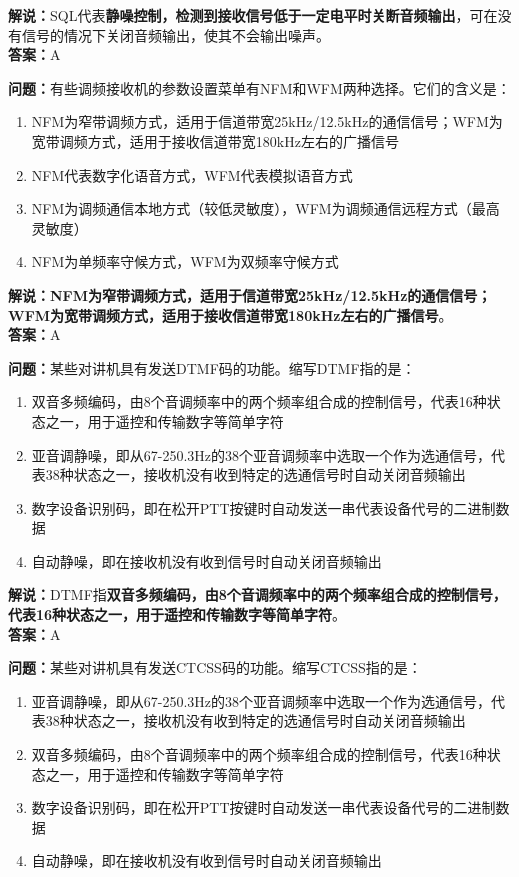 \textbf{解说：}SQL代表\textbf{静噪控制，检测到接收信号低于一定电平时关断音频输出}，可在没有信号的情况下关闭音频输出，使其不会输出噪声。\\\textbf{答案：}A%



\textbf{问题：}有些调频接收机的参数设置菜单有NFM和WFM两种选择。它们的含义是：

\begin{enumerate}[label=\Alph*), leftmargin=1.5cm]
	\item NFM为窄带调频方式，适用于信道带宽25kHz/12.5kHz的通信信号；WFM为宽带调频方式，适用于接收信道带宽180kHz左右的广播信号
	\item NFM代表数字化语音方式，WFM代表模拟语音方式
	\item NFM为调频通信本地方式（较低灵敏度），WFM为调频通信远程方式（最高灵敏度）
	\item NFM为单频率守候方式，WFM为双频率守候方式
\end{enumerate}

\textbf{解说：NFM为窄带调频方式，适用于信道带宽25kHz/12.5kHz的通信信号；WFM为宽带调频方式，适用于接收信道带宽180kHz左右的广播信号}。\\\textbf{答案：}A%



\textbf{问题：}某些对讲机具有发送DTMF码的功能。缩写DTMF指的是：

\begin{enumerate}[label=\Alph*), leftmargin=1.5cm]
	\item 双音多频编码，由8个音调频率中的两个频率组合成的控制信号，代表16种状态之一，用于遥控和传输数字等简单字符
	\item 亚音调静噪，即从67-250.3Hz的38个亚音调频率中选取一个作为选通信号，代表38种状态之一，接收机没有收到特定的选通信号时自动关闭音频输出
	\item 数字设备识别码，即在松开PTT按键时自动发送一串代表设备代号的二进制数据
	\item 自动静噪，即在接收机没有收到信号时自动关闭音频输出
\end{enumerate}

\textbf{解说：}DTMF指\textbf{双音多频编码，由8个音调频率中的两个频率组合成的控制信号，代表16种状态之一，用于遥控和传输数字等简单字符}。\\\textbf{答案：}A%



\textbf{问题：}某些对讲机具有发送CTCSS码的功能。缩写CTCSS指的是：

\begin{enumerate}[label=\Alph*), leftmargin=1.5cm]
	\item 亚音调静噪，即从67-250.3Hz的38个亚音调频率中选取一个作为选通信号，代表38种状态之一，接收机没有收到特定的选通信号时自动关闭音频输出
	\item 双音多频编码，由8个音调频率中的两个频率组合成的控制信号，代表16种状态之一，用于遥控和传输数字等简单字符
	\item 数字设备识别码，即在松开PTT按键时自动发送一串代表设备代号的二进制数据
	\item 自动静噪，即在接收机没有收到信号时自动关闭音频输出
\end{enumerate}

